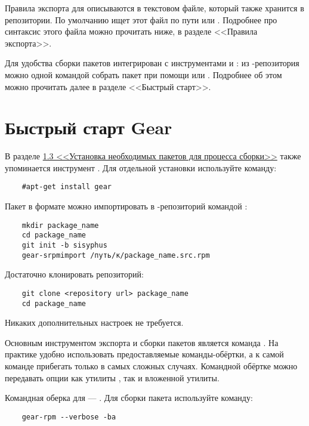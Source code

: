 Правила экспорта для  описываются в текстовом файле, который также хранится в 
репозитории. По умолчанию  ищет этот файл по пути  или . 
Подробнее про синтаксис этого файла можно прочитать ниже, в разделе <<Правила экспорта>>.

Для удобства сборки пакетов  интегрирован с инструментами  и 
: из -репозитория можно одной командой собрать пакет при помощи 
 или . Подробнее об этом можно прочитать далее в разделе <<Быстрый старт>>. 


\section{Быстрый старт Gear}

В разделе \hyperlink{1.3}{1.3 <<Установка необходимых пакетов для процесса сборки>>} 
также упоминается инструмент . Для отдельной установки используйте команду: 
\begin{verbatim}
	#apt-get install gear
\end{verbatim}


Пакет в формате  можно импортировать в -репозиторий командой :
\begin{verbatim}
	mkdir package_name
	cd package_name
	git init -b sisyphus
	gear-srpmimport /путь/к/package_name.src.rpm
\end{verbatim}


Достаточно клонировать репозиторий: 
\begin{verbatim}
	git clone <repository url> package_name
	cd package_name
\end{verbatim}

Никаких дополнительных настроек не требуется.


Основным инструментом экспорта и сборки пакетов является команда . На практике удобно 
использовать предоставляемые команды-обёртки, а к самой команде  прибегать только в 
самых сложных случаях. Командной обёртке можно передавать опции как утилиты , так и 
вложенной утилиты.

Командная оберка  для  --- . Для сборки пакета используйте команду: 
\begin{verbatim}
	gear-rpm --verbose -ba
\end{verbatim}


